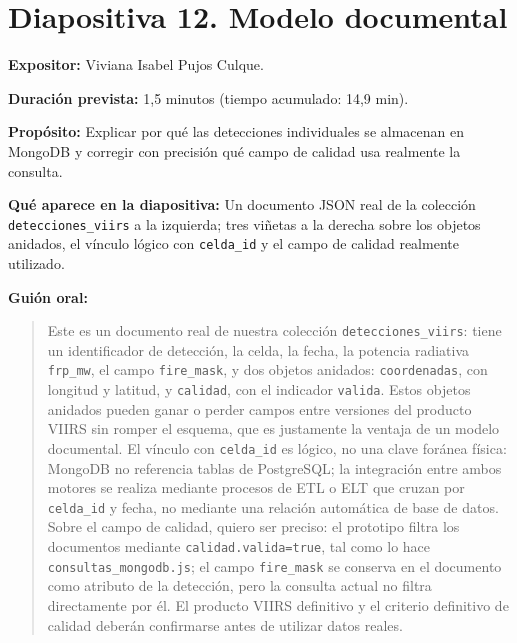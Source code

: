 \documentclass[11pt,a4paper]{article}
\newcommand{\campo}[2]{\par\medskip\noindent\textbf{#1:} #2\par}
\newenvironment{guionoral}{%
  \medskip\noindent\textbf{Gui\'on oral:}\par\smallskip
  \begin{quote}\small
}{%
  \end{quote}
}
\newcommand{\separadordiapositiva}{\bigskip\noindent{\color{Tierra!60}\hrulefill}\bigskip}
\begin{document}
\separadordiapositiva

\section*{Diapositiva 12. Modelo documental}

\campo{Expositor}{Viviana Isabel Pujos Culque.}
\campo{Duraci\'on prevista}{1,5 minutos (tiempo acumulado: 14,9 min).}
\campo{Prop\'osito}{Explicar por qu\'e las detecciones individuales se
almacenan en MongoDB y corregir con precisi\'on qu\'e campo de calidad
usa realmente la consulta.}
\campo{Qu\'e aparece en la diapositiva}{Un documento JSON real de la
colecci\'on \texttt{detecciones\_viirs} a la izquierda; tres vi\~netas a
la derecha sobre los objetos anidados, el v\'inculo l\'ogico con
\texttt{celda\_id} y el campo de calidad realmente utilizado.}

\begin{guionoral}
Este es un documento real de nuestra colecci\'on
\texttt{detecciones\_viirs}: tiene un identificador de detecci\'on, la
celda, la fecha, la potencia radiativa \texttt{frp\_mw}, el campo
\texttt{fire\_mask}, y dos objetos anidados: \texttt{coordenadas}, con
longitud y latitud, y \texttt{calidad}, con el indicador
\texttt{valida}. Estos objetos anidados pueden ganar o perder campos
entre versiones del producto VIIRS sin romper el esquema, que es
justamente la ventaja de un modelo documental. El v\'inculo con
\texttt{celda\_id} es l\'ogico, no una clave for\'anea f\'isica: MongoDB
no referencia tablas de PostgreSQL; la integraci\'on entre ambos
motores se realiza mediante procesos de ETL o ELT que cruzan por
\texttt{celda\_id} y fecha, no mediante una relaci\'on autom\'atica de
base de datos. Sobre el campo de calidad, quiero ser preciso: el
prototipo filtra los documentos mediante \texttt{calidad.valida=true},
tal como lo hace \texttt{consultas\_mongodb.js}; el campo
\texttt{fire\_mask} se conserva en el documento como atributo de la
detecci\'on, pero la consulta actual no filtra directamente por \'el.
El producto VIIRS definitivo y el criterio definitivo de calidad
deber\'an confirmarse antes de utilizar datos reales.
\end{guionoral}
\end{document}
